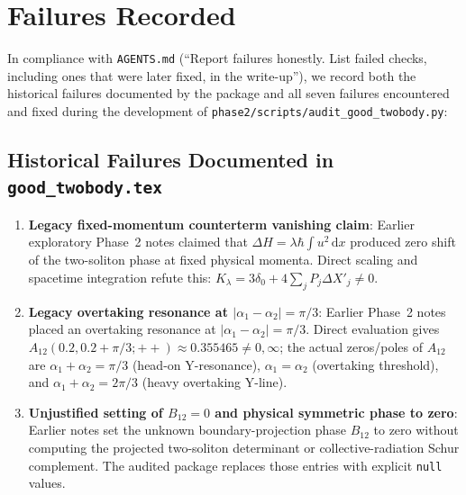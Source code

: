 \documentclass[11pt,a4paper]{article}
\newcommand{\dd}{\mathrm{d}}
\begin{document}
\section{Failures Recorded}

In compliance with \texttt{AGENTS.md} (``Report failures honestly. List failed checks, including ones that were later fixed, in the write-up''), we record both the historical failures documented by the package and all seven failures encountered and fixed during the development of \texttt{phase2/scripts/audit\_good\_twobody.py}:

\subsection{Historical Failures Documented in \texttt{good\_twobody.tex}}
\begin{enumerate}
\item \textbf{Legacy fixed-momentum counterterm vanishing claim}: Earlier exploratory Phase~2 notes claimed that $\Delta H = \lambda\hbar\int u^2\,\dd x$ produced zero shift of the two-soliton phase at fixed physical momenta. Direct scaling and spacetime integration refute this: $K_\lambda = 3\delta_0 + 4\sum_j P_j \Delta X'_j \neq 0$.
\item \textbf{Legacy overtaking resonance at $|\alpha_1-\alpha_2|=\pi/3$}: Earlier Phase~2 notes placed an overtaking resonance at $|\alpha_1-\alpha_2|=\pi/3$. Direct evaluation gives $A_{12}(0.2, 0.2+\pi/3; ++) \approx 0.355465 \neq 0,\infty$; the actual zeros/poles of $A_{12}$ are $\alpha_1+\alpha_2=\pi/3$ (head-on Y-resonance), $\alpha_1=\alpha_2$ (overtaking threshold), and $\alpha_1+\alpha_2=2\pi/3$ (heavy overtaking Y-line).
\item \textbf{Unjustified setting of $B_{12}=0$ and physical symmetric phase to zero}: Earlier notes set the unknown boundary-projection phase $B_{12}$ to zero without computing the projected two-soliton determinant or collective-radiation Schur complement. The audited package replaces those entries with explicit \texttt{null} values.
\end{enumerate}
\end{document}
